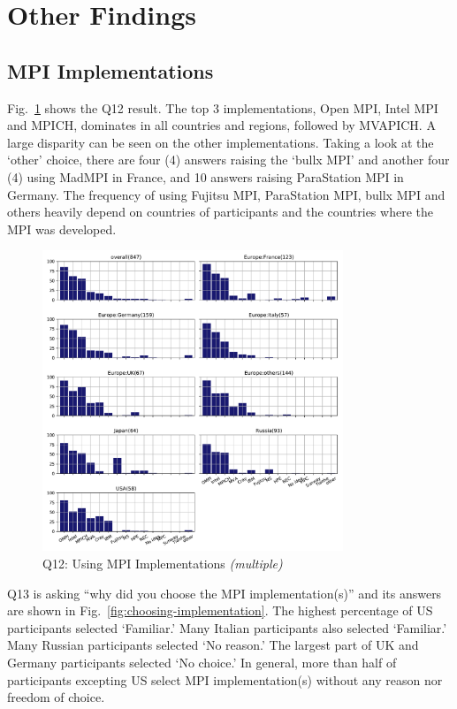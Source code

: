 \documentclass[conference,10pt,letterpaper]{IEEEtran}
\def\myquote#1{`#1'}
\begin{document}
\section{Other Findings}

\subsection{MPI Implementations}

Fig.~\ref{fig:using-implementations} shows the Q12 result. The top 3
implementations, Open MPI, Intel MPI and MPICH, dominates in all
countries and regions, followed by MVAPICH. A large disparity can be
seen on the other implementations. Taking a
look at the \myquote{other} choice, there are four (4) answers raising the
\myquote{bullx MPI} and another four (4) using MadMPI in France, and 10
answers raising ParaStation MPI in Germany. The frequency of using
Fujitsu MPI, ParaStation MPI, bullx MPI and others heavily depend on
countries of participants and the countries where the MPI was
developed. 

\begin{figure}[htb]
\begin{center}
\includegraphics[width=9cm]{Figs/Q12.pdf}
\caption{Q12: Using MPI Implementations {\it(multiple)}}
\label{fig:using-implementations}
\end{center}
\end{figure}

Q13 is asking ``why did you choose the MPI implementation(s)'' and its
answers are shown in Fig.~\ref{fig:choosing-implementation}. The highest
percentage of US participants selected `Familiar.' Many Italian
participants also selected \myquote{Familiar.} Many Russian
participants selected \myquote{No reason.} The largest part of UK and Germany
participants selected \myquote{No choice.}
In general, more than half of participants excepting US select MPI
implementation(s) without any reason nor freedom of choice.
\end{document}
